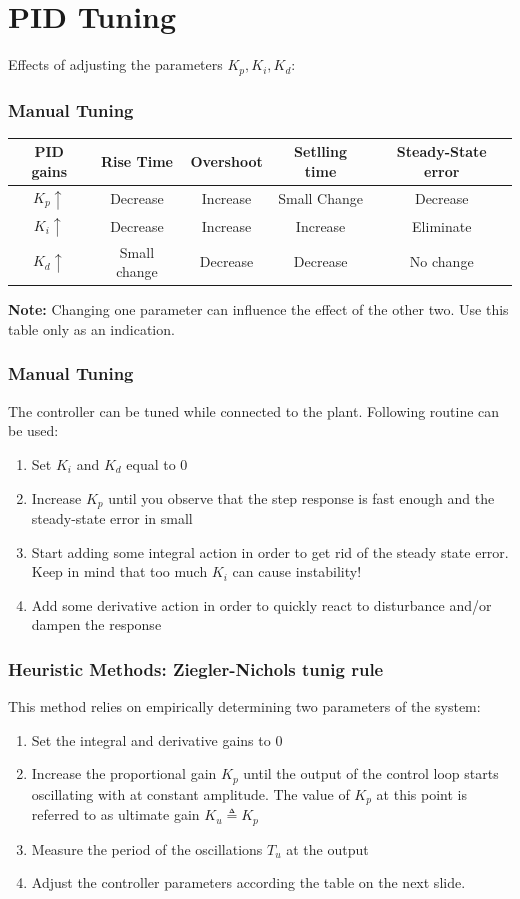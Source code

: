 \section{PID Tuning}

\begin{frame}
	Effects of adjusting the parameters $K_p, K_i, K_d$:
	\vspace{1em}
	\frametitle{Manual Tuning}
	{
	\small
	\begin{tabular}{c | c | c | c | c }
		PID gains	&	Rise Time 	&	Overshoot	&	Setlling time	&	Steady-State error \\
		\hline
		$K_p \uparrow$ & Decrease	&	Increase	&	Small Change	&	Decrease \\
		$K_i \uparrow$ & Decrease	&	Increase	&	Increase		&	Eliminate \\
		$K_d \uparrow$ & Small change &	Decrease	&	Decrease		&	No change \\
	\end{tabular}
	}
	\vspace{1em}
	
	\textbf{Note:} Changing one parameter can influence the effect of the other two. Use this table only as an indication.
\end{frame}

\begin{frame}
	\frametitle{Manual Tuning}
	The controller can be tuned while connected to the plant. Following routine can be used:
	\begin{enumerate}
		\item Set $K_i$ and $K_d$ equal to 0
		\item Increase $K_p$ until you observe that the step response is fast enough and the steady-state error in small
		\item Start adding some integral action in order to get rid of the steady state error. Keep in mind that too much $K_i$ can cause instability!
		\item Add some derivative action in order to quickly react to disturbance and/or dampen the response
		
	\end{enumerate}
\end{frame}


\begin{frame}
	\frametitle{Heuristic Methods: Ziegler-Nichols tunig rule}
		This method relies on empirically determining two parameters of the system:
		\begin{enumerate}
			\item Set the integral and derivative gains to 0
			\item Increase the proportional gain $K_p$ until the output of the control loop starts oscillating with at constant amplitude. The value of $K_p$ at this point is referred to as ultimate gain $K_u \triangleq K_p$
			\item Measure the period of the oscillations $T_u$ at the output
			\item Adjust the controller parameters according the table on the next slide.
		\end{enumerate}
\end{frame}

